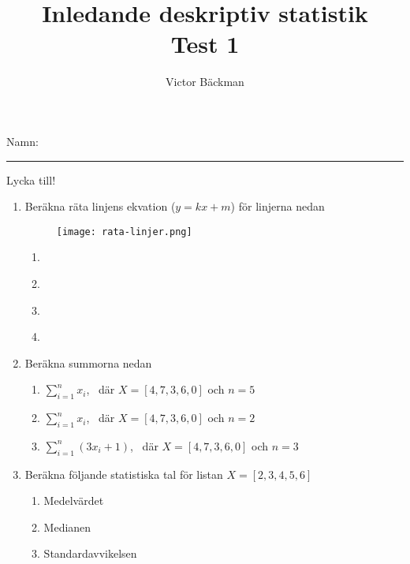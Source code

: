 \documentclass[a4paper,10pt]{article}
\title{Inledande deskriptiv statistik \\ {\large Test 1}}
\author{Victor Bäckman}
\begin{document}
\maketitle
\vspace{2cm}
Namn:
{\rule{13cm}{0.4pt}}
\vspace{8cm}
\begin{center}
  {\huge Lycka till!}
\end{center}
\newpage
\begin{enumerate}
  \item{Beräkna räta linjens ekvation ($y=kx + m$) för linjerna nedan}
    \begin{figure}[h]
      \texttt{[image: rata-linjer.png]}
    \end{figure}
    \begin{enumerate}
      \item{ }
      \vspace{2cm}
      \item{ }
      \vspace{2cm}
      \item{ }
      \vspace{2cm}
      \item{ }
      \vspace{2cm}
    \end{enumerate}
    \newpage
  \item{Beräkna summorna nedan}
    \begin{enumerate}
        \item{$\sum_{i=1}^{n}x_i$, \, där $X=[4, 7, 3, 6, 0]$ och $n=5$}
        \vspace{5cm}
        \item{$\sum_{i=1}^{n}x_i$, \, där $X=[4, 7, 3, 6, 0]$ och $n=2$}
        \vspace{5cm}
        \item{$\sum_{i=1}^{n} (3x_i + 1)$, \, där $X=[4, 7, 3, 6, 0]$ och $n=3$}
    \end{enumerate}
  \newpage
  \item{Beräkna följande statistiska tal för listan $X=[2, 3, 4, 5, 6]$}
    \begin{enumerate}
      \item{Medelvärdet}
      \vspace{5cm}
      \item{Medianen}
      \vspace{5cm}
      \item{Standardavvikelsen}
    \end{enumerate}
\end{enumerate}
\vfill
\end{document}
